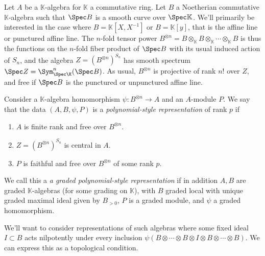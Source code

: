  Let $A$ be a $\mathbb{K}$-algebra for $\mathbb{K}$ a commutative
 ring. Let $B$ a Noetherian commutative $\mathbb{K}$-algebra such
 that $\Spec B$ is a smooth curve over $\Spec \mathbb{K}$. We'll
 primarily be interested in the case where $B=\mathbb{K}[X,X^{-1}]$
 or $B=\mathbb{K}[y]$, that is the affine line or punctured affine
 line. The $n$-fold tensor power $B^{\otimes
 n}=B\otimes_{\mathbb{K}} B\otimes_{\mathbb{K}} \cdots
 \otimes_{\mathbb{K}} B$ is thus the functions on the $n$-fold fiber
 product of $\Spec B$ with its usual induced action of $S_n$, and the
 algebra $Z=(B^{\otimes n})^{S_n}$ has smooth spectrum $\Spec
 Z=\Sym^n_{\Spec\K}(\Spec B)$. As usual, $B^{\otimes n}$ is projective of
 rank $n!$ over $Z$, and free if $\Spec B$ is the punctured or
 unpunctured affine line.
\begin{defi}
 Consider a $\mathbb{K}$-algebra homomorphism $\psi\colon B^{\otimes
 n}\to A$ and an $A$-module $P$. We say that the data $(A,B,\psi,P)$ is a
 \emph{polynomial-style representation} of rank $p$ if 
 \begin{enumerate}
 \item $A$ is finite rank and free over $B^{\otimes n}$.
 \item $Z=(B^{\otimes n})^{S_n}$ is central in $A$.
 \item $P$ is faithful and free
 over $B^{\otimes n} $ of some rank $p$.
 \end{enumerate}
 We call this a \emph{a graded polynomial-style representation} if in
 addition $A, B$ are graded $\mathbb{K}$-algebras (for some grading
 on $\mathbb{K}$), with $B$ graded local with unique
 graded maximal ideal given by $B_{>0}$, $P$ is a graded module, and $\psi$ a graded
 homomorphism. 
\end{defi}

We'll want to consider representations of such algebras where some fixed
ideal $I\subset B$ acts nilpotently under every inclusion
$\psi(B\otimes \cdots \otimes B\otimes I \otimes B\otimes \cdots \otimes B)$. We can
express this as a topological condition.

